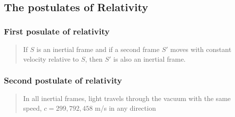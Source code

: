 \subsection{The postulates of Relativity}

\subsubsection{First posulate of relativity}
\begin{quote}
    If $S$ is an inertial frame and if a second frame $S'$ moves with constant velocity relative to $S$, then $S'$ is also an inertial frame.
\end{quote}

\subsubsection{Second postulate of relativity}
\begin{quote}
    In all inertial frames, light travels through the vacuum with the same speed, $c = 299,792,458 $ m/s in any direction
\end{quote}
